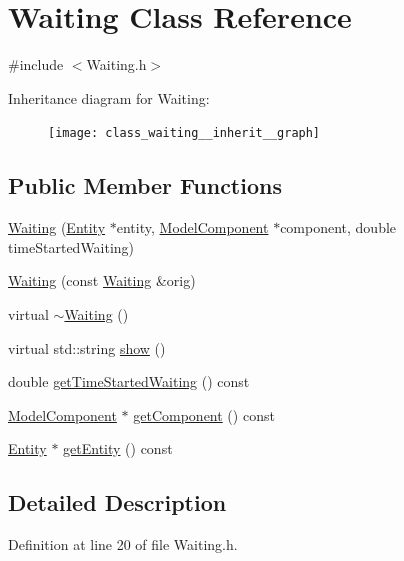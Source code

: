 \hypertarget{class_waiting}{\section{Waiting Class Reference}
\label{class_waiting}
}


{\ttfamily \#include $<$Waiting.\-h$>$}



Inheritance diagram for Waiting\-:\nopagebreak
\begin{figure}[H]
\begin{center}
\leavevmode
\texttt{[image: class\_waiting\_\_inherit\_\_graph]}
\end{center}
\end{figure}
\subsection*{Public Member Functions}
\begin{DoxyCompactItemize}
\item 
\hyperlink{class_waiting_af7d1cfae938291ec27b4a56903e1f22a}{Waiting} (\hyperlink{class_entity}{Entity} $\ast$entity, \hyperlink{class_model_component}{Model\-Component} $\ast$component, double time\-Started\-Waiting)
\item 
\hyperlink{class_waiting_ada76900d8ad0e1684007b44e64d6ab58}{Waiting} (const \hyperlink{class_waiting}{Waiting} \&orig)
\item 
virtual \hyperlink{class_waiting_a21c753b1e80111e3ee5fd7f50dd31a14}{$\sim$\-Waiting} ()
\item 
virtual std\-::string \hyperlink{class_waiting_aa8b8a3e589f580e3e066a0f9423f4c76}{show} ()
\item 
double \hyperlink{class_waiting_aa8e4f3da6ac3258608614fe1d87b02f3}{get\-Time\-Started\-Waiting} () const 
\item 
\hyperlink{class_model_component}{Model\-Component} $\ast$ \hyperlink{class_waiting_a438cf79ba5abb0f3128b4bc9b8677728}{get\-Component} () const 
\item 
\hyperlink{class_entity}{Entity} $\ast$ \hyperlink{class_waiting_a6da280243a164c9304f91902001d5edd}{get\-Entity} () const 
\end{DoxyCompactItemize}


\subsection{Detailed Description}


Definition at line 20 of file Waiting.\-h.



